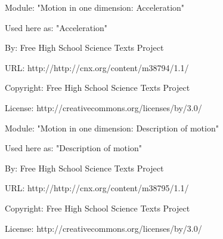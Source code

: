       \par\vspace{9pt}\noindent\begin{minipage}{\textwidth}
      Module: "Motion in one dimension: Acceleration" \par\nopagebreak\noindent
      Used here as: "Acceleration" \par\nopagebreak\noindent
        By: Free High School Science Texts Project\par\nopagebreak\noindent
      URL: http://http://cnx.org/content/m38794/1.1/\par\nopagebreak\noindent
      \par\nopagebreak\noindent
      Copyright: Free High School Science Texts Project\par\nopagebreak\noindent
      License:  http://creativecommons.org/licenses/by/3.0/\par\nopagebreak\noindent
      \par\end{minipage}
      \par\vspace{9pt}\noindent\begin{minipage}{\textwidth}
      Module: "Motion in one dimension: Description of motion" \par\nopagebreak\noindent
      Used here as: "Description of motion" \par\nopagebreak\noindent
        By: Free High School Science Texts Project\par\nopagebreak\noindent
      URL: http://http://cnx.org/content/m38795/1.1/\par\nopagebreak\noindent
      \par\nopagebreak\noindent
      Copyright: Free High School Science Texts Project\par\nopagebreak\noindent
      License:  http://creativecommons.org/licenses/by/3.0/\par\nopagebreak\noindent
      \par\end{minipage}
